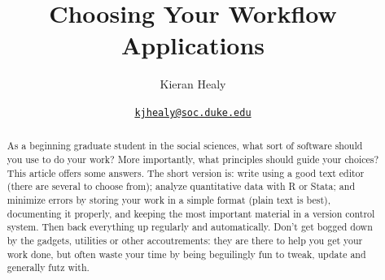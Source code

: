 \documentclass[11pt,article,oneside]{memoir}
\begin{document}
\pagestyle{kjh}

\setsansfont[Mapping=tex-text]{Myriad Pro} 
\setmonofont[Mapping=tex-text,Scale=0.9]{Inconsolata} 

\title{\bigskip Choosing Your Workflow Applications}

\author{Kieran Healy}
\date{{\scriptsize{\texttt{\href{mailto:kjhealy@soc.duke.edu}{kjhealy@soc.duke.edu}}}}} 


\maketitle

%  


\thispagestyle{kjhgit}
 
\begin{abstract}
\noindent As a beginning graduate student in the social sciences, what sort of software should you use to do your work? More importantly, what principles should guide your choices? This article offers some answers. The short version is: write using a good text editor (there are several to choose from); analyze quantitative data with R or Stata; and minimize errors by storing your work in a simple format (plain text is best), documenting it properly, and keeping the most important material in a version control system. Then back everything up regularly and automatically. Don't get bogged down by the gadgets, utilities or other accoutrements: they are there to help you get your work done, but often  waste your time by being beguilingly fun to tweak, update and generally futz with.  
\end{abstract}
\end{document}
